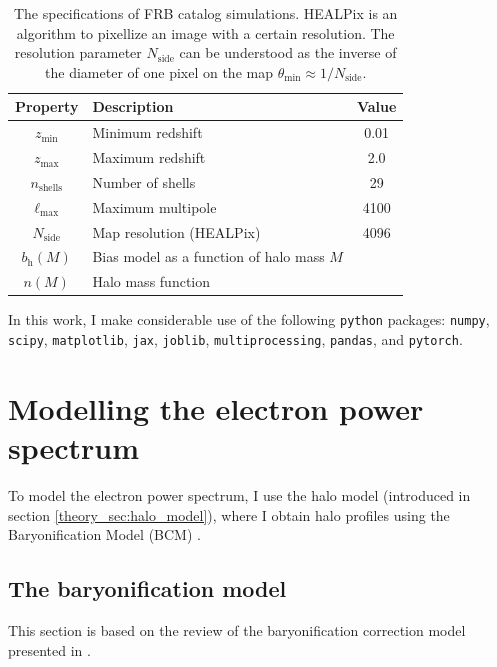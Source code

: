 \begin{table}[h]
\centering
\begin{tabular}{c p{8cm} c}
\hline\hline
\textbf{Property} & \textbf{Description} & \textbf{Value} \\
\hline
$z_{\min}$ & Minimum redshift & 0.01 \\
$z_{\max}$ & Maximum redshift & 2.0 \\
$n_{\mathrm{shells}}$ & Number of shells & 29\\
$\ell_{\max}$ & Maximum multipole & 4100 \\
$N_{\mathrm{side}}$ & Map resolution (HEALPix) & 4096 \\
$b_{\mathrm{h}}(M)$ & Bias model as a function of halo mass $M$ & \citet{tinker2010large}\\
$n(M)$ & Halo mass function & \citet{tinker2008toward} \\
\hline\hline
\end{tabular}
\caption{The specifications of FRB catalog simulations. HEALPix \citep{gorski2005healpix} is an algorithm to pixellize an image with a certain resolution. The resolution parameter $N_\mathrm{side}$ can be understood as the inverse of the diameter of one pixel on the map $\theta_\mathrm{min} \approx 1/N_\mathrm{side}$.}
\label{tab:sim_spec}
\end{table}

In this work, I make considerable use of the following \texttt{python} packages: \texttt{numpy}, \texttt{scipy}, \texttt{matplotlib}, \texttt{jax}, \texttt{joblib}, \texttt{multiprocessing}, \texttt{pandas}, and \texttt{pytorch}.

\section{Modelling the electron power spectrum} \label{meth_sec:pee}
To model the electron power spectrum, I use the halo model (introduced in section \ref{theory_sec:halo_model}), where I obtain halo profiles using the Baryonification Model (BCM) \citep{Schneider_Teyssier_2015,Schneider_Kovač_etal._2025}.


\subsection{The baryonification model} \label{meth_sec:bfc}
This section is based on the review of the baryonification correction model presented in \citet{torkamani2026baryonification}.

